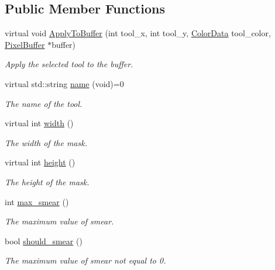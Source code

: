 \subsection*{Public Member Functions}
\begin{DoxyCompactItemize}
\item 
virtual void \hyperlink{classimage__tools_1_1Tool_a5427081ae4c0a20427bad3deb39e5857}{Apply\+To\+Buffer} (int tool\+\_\+x, int tool\+\_\+y, \hyperlink{classimage__tools_1_1ColorData}{Color\+Data} tool\+\_\+color, \hyperlink{classimage__tools_1_1PixelBuffer}{Pixel\+Buffer} $\ast$buffer)
\begin{DoxyCompactList}\small\item\em Apply the selected tool to the buffer. \end{DoxyCompactList}\item 
virtual std\+::string \hyperlink{classimage__tools_1_1Tool_a251c179e3ac9756d08fbcd082750f8a9}{name} (void)=0
\begin{DoxyCompactList}\small\item\em The name of the tool. \end{DoxyCompactList}\item 
virtual int \hyperlink{classimage__tools_1_1Tool_a70a671fbda82c746468e1a0c5c898c08}{width} ()
\begin{DoxyCompactList}\small\item\em The width of the mask. \end{DoxyCompactList}\item 
virtual int \hyperlink{classimage__tools_1_1Tool_ae1a7d1d03e2128da512ef20c294bfca9}{height} ()
\begin{DoxyCompactList}\small\item\em The height of the mask. \end{DoxyCompactList}\item 
int \hyperlink{classimage__tools_1_1Tool_adc29d68691b4d2013c9814cd79cfd36f}{max\+\_\+smear} ()
\begin{DoxyCompactList}\small\item\em The maximum value of smear. \end{DoxyCompactList}\item 
bool \hyperlink{classimage__tools_1_1Tool_a3247e5e36cb8aa534bc751ca30bef954}{should\+\_\+smear} ()
\begin{DoxyCompactList}\small\item\em The maximum value of smear not equal to 0. \end{DoxyCompactList}\end{DoxyCompactItemize}
